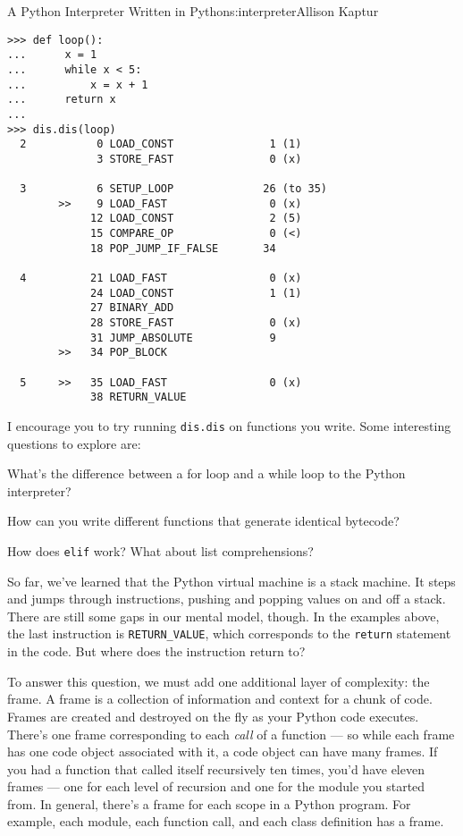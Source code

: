 \begin{aosachapter}{A Python Interpreter Written in Python}{s:interpreter}{Allison Kaptur}
\begin{verbatim}
>>> def loop():
...      x = 1
...      while x < 5:
...          x = x + 1
...      return x
...
>>> dis.dis(loop)
  2           0 LOAD_CONST               1 (1)
              3 STORE_FAST               0 (x)

  3           6 SETUP_LOOP              26 (to 35)
        >>    9 LOAD_FAST                0 (x)
             12 LOAD_CONST               2 (5)
             15 COMPARE_OP               0 (<)
             18 POP_JUMP_IF_FALSE       34

  4          21 LOAD_FAST                0 (x)
             24 LOAD_CONST               1 (1)
             27 BINARY_ADD
             28 STORE_FAST               0 (x)
             31 JUMP_ABSOLUTE            9
        >>   34 POP_BLOCK

  5     >>   35 LOAD_FAST                0 (x)
             38 RETURN_VALUE
\end{verbatim}

\label{explore-bytecode}

I encourage you to try running \texttt{dis.dis} on functions you write.
Some interesting questions to explore are:

\begin{aosaitemize}

\item
  What's the difference between a for loop and a while loop to the
  Python interpreter?
\item
  How can you write different functions that generate identical
  bytecode?
\item
  How does \texttt{elif} work? What about list comprehensions?
\end{aosaitemize}

\label{frames}

So far, we've learned that the Python virtual machine is a stack
machine. It steps and jumps through instructions, pushing and popping
values on and off a stack. There are still some gaps in our mental
model, though. In the examples above, the last instruction is
\texttt{RETURN\_VALUE}, which corresponds to the \texttt{return}
statement in the code. But where does the instruction return to?

To answer this question, we must add one additional layer of complexity:
the frame. A frame is a collection of information and context for a
chunk of code. Frames are created and destroyed on the fly as your
Python code executes. There's one frame corresponding to each
\emph{call} of a function --- so while each frame has one code object
associated with it, a code object can have many frames. If you had a
function that called itself recursively ten times, you'd have eleven
frames --- one for each level of recursion and one for the module you
started from. In general, there's a frame for each scope in a Python
program. For example, each module, each function call, and each class
definition has a frame.


\end{aosachapter}
